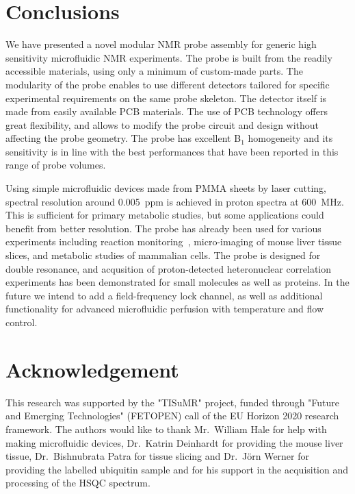 \documentclass[preprint,5p]{elsarticle}
\begin{document}
\section{Conclusions}
We have presented a novel modular NMR probe assembly for generic high 
sensitivity microfluidic NMR experiments. 
The probe is built from the readily accessible materials, using only a minimum
of custom-made parts. 
The modularity of the probe enables to use different detectors 
tailored for specific experimental requirements on the same probe skeleton. 
The detector itself is made from easily available PCB materials. 
The use of PCB technology offers great flexibility, and allows to modify the 
probe circuit and design without affecting the probe geometry. 
The probe has excellent B$_1$ homogeneity and its sensitivity is in line with
the best performances that have been reported in this range of probe volumes.

Using simple microfluidic devices made from PMMA sheets by laser cutting,
spectral resolution around 0.005~ppm is achieved in proton spectra at 
600~MHz. This is sufficient for primary metabolic studies, but some
applications could benefit from better resolution. The probe has already been 
used for various  experiments including reaction monitoring~\cite{Fang-2018}, 
micro-imaging of mouse liver tissue slices, and metabolic studies of 
mammalian cells. The probe is designed for double resonance, and
acqusition of proton-detected heteronuclear correlation experiments
has been demonstrated for small molecules as well as proteins. 
In the future we intend to add a field-frequency lock channel,
as well as additional functionality for advanced microfluidic perfusion with temperature and flow control.
\section{Acknowledgement}
This research was supported by the "TISuMR" project,
funded through "Future and Emerging Technologies" (FETOPEN) 
call of the EU Horizon 2020 research framework. The authors would like to 
thank Mr.~William Hale for help with
making microfluidic devices, Dr.~Katrin Deinhardt for providing 
the mouse liver tissue, Dr.~Bishnubrata Patra for tissue slicing and Dr.~J\"{o}rn Werner for providing the 
labelled ubiquitin sample and for his support in the acquisition
and processing of the HSQC spectrum.
\clearpage


\end{document}
